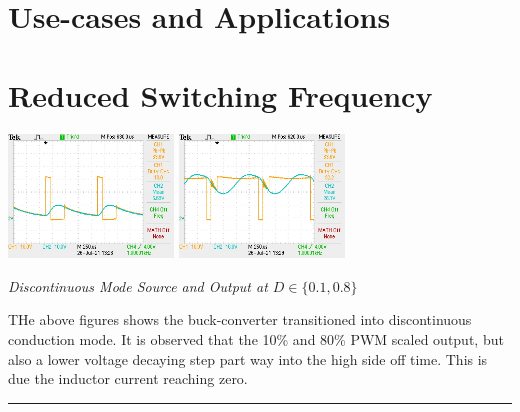 \documentclass[11pt]{article}
\begin{document}
\begin{preview}
\begin{center}
    \end{center}
    \section{Use-cases and Applications}

    \section{Reduced Switching Frequency}
    \begin{center}
        \includegraphics[width=0.33\textwidth]{img/D10_1K.JPG}
        \includegraphics[width=0.33\textwidth]{img/D80_1K.JPG}

        \textit{Discontinuous Mode Source and Output at $D \in \{0.1, 0.8\}$}
    \end{center}

    THe above figures shows the buck-converter transitioned into discontinuous conduction mode. It is observed that the 10\% and 80\% PWM scaled output, but also a lower voltage decaying step part way into the high side off time. This is due the inductor current reaching zero.

    \hrule
\end{preview}
\end{document}
